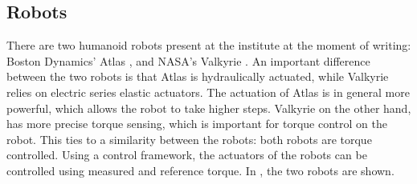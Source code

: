 \subsection{Robots}
There are two humanoid robots present at the institute at the moment of writing: Boston Dynamics' Atlas \cite{koolen2016design}, \cite{kuindersma2016optimization} and NASA's Valkyrie \cite{radford2015valkyrie}. An important difference between the two robots is that Atlas is hydraulically actuated, while Valkyrie relies on electric series elastic actuators. The actuation of Atlas is in general more powerful, which allows the robot to take higher steps. Valkyrie on the other hand, has more precise torque sensing, which is important for torque control on the robot. This ties to a similarity between the robots: both robots are torque controlled. Using a control framework, the actuators of the robots can be controlled using measured and reference torque. In , the two robots are shown.
